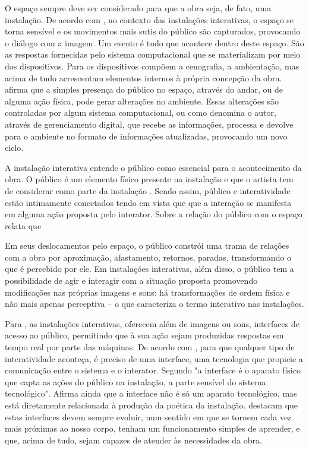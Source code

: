O espaço sempre deve ser considerado para que a obra seja, de fato, uma instalação. De acordo com , no contexto das instalações interativas, o espaço se torna sensível e os movimentos mais sutis do público são capturados, provocando o diálogo com a imagem. Um evento é tudo que acontece dentro deste espaço. São as respostas fornecidas pelo sistema computacional que se materializam por meio dos dispositivos. Para  os dispositivos compõem a cenografia, a
ambientação, mas acima de tudo acrescentam elementos internos à própria concepção
da obra.  afirma que a simples presença do público no espaço, através do andar, ou de alguma ação física, pode gerar alterações no ambiente. Essas alterações são controladas por algum sistema computacional, ou como denomina o autor, através de gerenciamento digital, que recebe as informações, processa e devolve para o ambiente no formato de informações atualizadas, provocando um novo ciclo.


A instalação interativa entende o público como essencial para o acontecimento da obra. O público é um elemento físico presente na instalação e que o artista tem de considerar como parte da instalação \cite[p. 64]{sogabe2011}. Sendo assim, público e interatividade estão intimamente conectados tendo em vista que que a interação se manifesta em alguma ação proposta pelo interator. Sobre a relação do público com o espaço  relata que

\begin{citacao}
Em seus deslocamentos pelo espaço, o público constrói uma trama de relações com a obra por aproximação, afastamento, retornos, paradas, transformando o que é percebido por ele. Em instalações interativas, além disso, o público tem a possibilidade de agir e interagir com a situação proposta promovendo modificações nas próprias imagens e sons:  há transformações de ordem física e não mais apenas perceptiva – o que caracteriza o termo interativo nas instalações.  \cite[p. 6]{bochio}  
\end{citacao}

Para , as instalações interativas, oferecem além de imagens ou sons, interfaces de acesso ao público, permitindo que à sua ação sejam produzidas respostas em tempo real por parte das máquinas. De acordo com , para que qualquer tipo de interatividade aconteça, é preciso de uma interface, uma tecnologia que propicie a comunicação entre o sistema e o interator. Segundo  "a interface é o aparato físico que capta as ações do público na instalação, a parte sensível do sistema tecnológico". Afirma ainda que a interface não é só um aparato tecnológico, mas está diretamente relacionada à produção da poética da instalação.  destacam que estas interfaces devem sempre evoluir, num sentido em que se tornem cada vez mais próximas ao nosso corpo, tenham um funcionamento simples de aprender, e que, acima de tudo, sejam capazes de atender às necessidades da obra.


